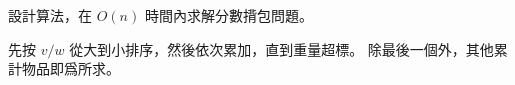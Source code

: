 \startEXERCISE\DIFFICULT
設計算法，在 $O(n)$ 時間內求解分數揹包問題。
\stopEXERCISE

\startANSWER
先按 $v/w$ 從大到小排序，然後依次累加，直到重量超標。
除最後一個外，其他累計物品即爲所求。
\stopANSWER
